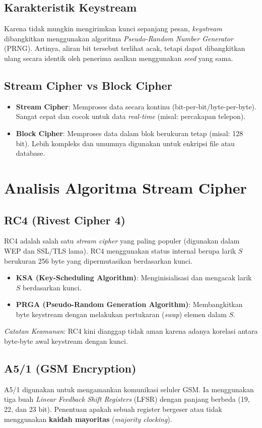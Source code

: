 \documentclass[../main.tex]{subfiles}
\begin{document}
\subsection{Karakteristik Keystream}
Karena tidak mungkin mengirimkan kunci sepanjang pesan, \textit{keystream} dibangkitkan menggunakan algoritma \textit{Pseudo-Random Number Generator} (PRNG). Artinya, aliran bit tersebut terlihat acak, tetapi dapat dibangkitkan ulang secara identik oleh penerima asalkan menggunakan \textit{seed} yang sama.

\subsection{Stream Cipher vs Block Cipher}
\begin{itemize}
    \item \textbf{Stream Cipher}: Memproses data secara kontinu (bit-per-bit/byte-per-byte). Sangat cepat dan cocok untuk data \textit{real-time} (misal: percakapan telepon).
    \item \textbf{Block Cipher}: Memproses data dalam blok berukuran tetap (misal: 128 bit). Lebih kompleks dan umumnya digunakan untuk enkripsi file atau database.
\end{itemize}

\section{Analisis Algoritma Stream Cipher}

\subsection{RC4 (Rivest Cipher 4)}
RC4 adalah salah satu \textit{stream cipher} yang paling populer (digunakan dalam WEP dan SSL/TLS lama). RC4 menggunakan status internal berupa larik $S$ berukuran 256 byte yang dipermutasikan berdasarkan kunci.
\begin{itemize}
    \item \textbf{KSA (Key-Scheduling Algorithm)}: Menginisialisasi dan mengacak larik $S$ berdasarkan kunci.
    \item \textbf{PRGA (Pseudo-Random Generation Algorithm)}: Membangkitkan byte keystream dengan melakukan pertukaran (\textit{swap}) elemen dalam $S$.
\end{itemize}
\textit{Catatan Keamanan}: RC4 kini dianggap tidak aman karena adanya korelasi antara byte-byte awal keystream dengan kunci.

\subsection{A5/1 (GSM Encryption)}
A5/1 digunakan untuk mengamankan komunikasi seluler GSM. Ia menggunakan tiga buah \textit{Linear Feedback Shift Registers} (LFSR) dengan panjang berbeda (19, 22, dan 23 bit). Penentuan apakah sebuah register bergeser atau tidak menggunakan \textbf{kaidah mayoritas} (\textit{majority clocking}).
\end{document}
